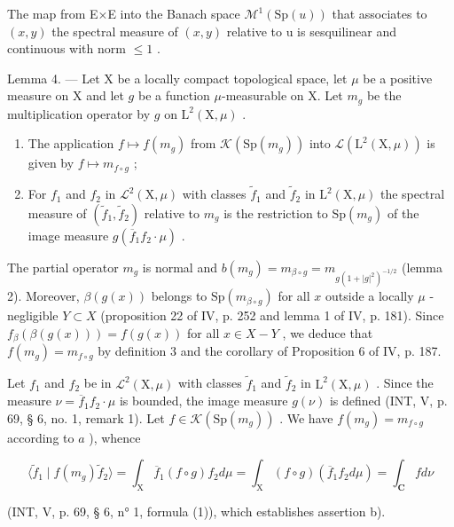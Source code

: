 The map from E×E into the Banach space \(\mathcal{M}^{1}(\mathrm{Sp}(u))\) that associates to \((x,y)\) the spectral measure of \((x,y)\) relative to u is sesquilinear and continuous with norm \(\leqslant 1\) .

Lemma 4. --- Let X be a locally compact topological space, let \(\mu\) be a positive measure on X and let \(g\) be a function \(\mu\)-measurable on X. Let \(m_g\) be the multiplication operator by \(g\) on \(\mathrm{L}^2 (\mathrm{X},\mu)\) .

\begin{enumerate}
\def\labelenumi{\alph{enumi})}
\item
  The application \(f\mapsto f(m_{g})\) from \(\mathcal{K}(\mathrm{Sp}(m_g))\) into \(\mathcal{L}(\mathrm{L}^{2}(\mathrm{X},\mu))\) is given by \(f\mapsto m_{f\circ g}\) ;
\item
  For \(f_1\) and \(f_2\) in \(\mathcal{L}^2(\mathrm{X},\mu)\) with classes \(\widetilde{f}_1\) and \(\widetilde{f}_2\) in \(\mathrm{L}^2(\mathrm{X},\mu)\) the spectral measure of \((\widetilde{f}_1,\widetilde{f}_2)\) relative to \(m_g\) is the restriction to \(\mathrm{Sp}(m_g)\) of the image measure \(g(\overline{f}_1f_2\cdot \mu)\) .
\end{enumerate}

The partial operator \(m_g\) is normal and \(b(m_g) = m_{\beta \circ g} = m_{g(1+|g|^2)^{-1/2}}\) (lemma 2). Moreover, \(\beta(g(x))\) belongs to \(\mathrm{Sp}(m_{\beta \circ g})\) for all \(x\) outside a locally \(\mu\) -negligible \(Y \subset X\) (proposition 22 of IV, p. 252 and lemma 1 of IV, p. 181). Since \(f_\beta(\beta(g(x))) = f(g(x))\) for all \(x \in X - Y\) , we deduce that \(f(m_g) = m_{f \circ g}\) by definition 3 and the corollary of Proposition 6 of IV, p. 187.

Let \(f_1\) and \(f_2\) be in \(\mathcal{L}^2(\mathrm{X},\mu)\) with classes \(\widetilde{f}_1\) and \(\widetilde{f}_2\) in \(\mathrm{L}^2(\mathrm{X},\mu)\) . Since the measure \(\nu = \overline{f}_1f_2\cdot \mu\) is bounded, the image measure \(g(\nu)\) is defined (INT, V, p. 69, § 6, no. 1, remark 1). Let \(f\in \mathcal{K}(\mathrm{Sp}(m_g))\) . We have \(f(m_{g}) = m_{f\circ g}\) according to \(a\) ), whence

\[
\langle \widetilde {f} _ {1} \mid f (m _ {g}) \widetilde {f} _ {2} \rangle = \int_ {\mathrm{X}} \overline {{f}} _ {1} (f \circ g) f _ {2} d \mu = \int_ {\mathrm{X}} (f \circ g) (\overline {{f}} _ {1} f _ {2} d \mu) = \int_ {\mathbf {C}} f d \nu
\]

(INT, V, p. 69, § 6, n° 1, formula (1)), which establishes assertion b).

